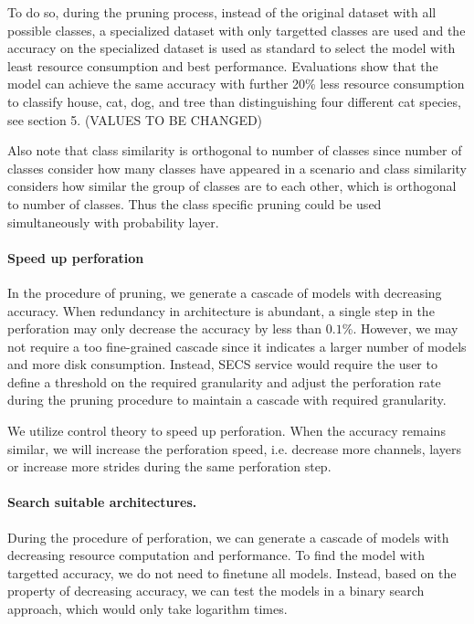 \documentclass[pageno]{jpaper}
\begin{document}
To do so, during the pruning process, instead of the original dataset with all possible classes, a specialized dataset with only targetted classes are used and the accuracy on the specialized dataset is used as standard to select the model with least resource consumption and best performance. Evaluations show that the model can achieve the same accuracy with further 20\% less resource consumption to classify house, cat, dog, and tree than distinguishing four different cat species, see section 5. (VALUES TO BE CHANGED)

Also note that class similarity is orthogonal to number of classes since number of classes consider how many classes have appeared in a scenario and class similarity considers how similar the group of classes are to each other, which is orthogonal to number of classes. Thus the class specific pruning could be used simultaneously with probability layer.

\paragraph{Speed up perforation}
In the procedure of pruning, we generate a cascade of models with decreasing accuracy. When redundancy in architecture is abundant, a single step in the perforation may only decrease the accuracy by less than $0.1$\%. However, we may not require a too fine-grained cascade since it indicates a larger number of models and more disk consumption. Instead, SECS service would require the user to define a threshold on the required granularity and adjust the perforation rate during the pruning procedure to maintain a cascade with required granularity. 

We utilize control theory to speed up perforation. When the accuracy remains similar, we will increase the perforation speed, i.e. decrease more channels, layers or increase more strides during the same perforation step.

\paragraph{Search suitable architectures.}
During the procedure of perforation, we can generate a cascade of models with decreasing resource computation and performance. To find the model with targetted accuracy, we do not need to finetune all models. Instead, based on the property of decreasing accuracy, we can test the models in a binary search approach, which would only take logarithm times.
\end{document}
